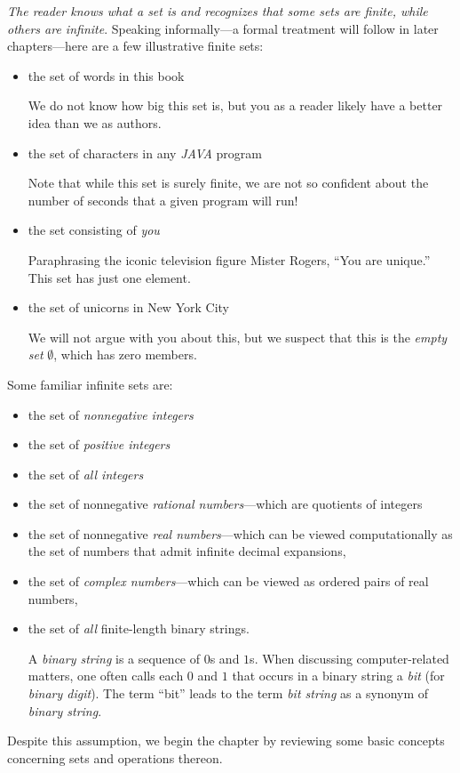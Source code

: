{\em The reader knows what a set is and recognizes that some sets are
  finite, while others are infinite}.  Speaking informally---a formal
treatment will follow in later chapters---here are a few illustrative
finite sets:
\begin{itemize}
\item
the set of words in this book

We do not know how big this set is, but you as a reader likely have a
better idea than we as authors.
\item
the set of characters in any {\it JAVA} program

Note that while this set is surely finite, we are not so confident
about the number of seconds that a given program will run!
\item
the set consisting of {\em you}

Paraphrasing the iconic television figure Mister Rogers, ``You are
unique.''  This set has just one element.

\item
the set of unicorns in New York City

We will not argue with you about this, but we suspect that this is the
{\em empty set} $\emptyset$, which has zero members.
\end{itemize}
Some familiar infinite sets are:
\begin{itemize}
\item
the set of {\em nonnegative integers}
\item
the set of {\em positive integers}
\item
the set of {\em all integers}
\item
the set of nonnegative {\em rational numbers}---which are quotients of
integers
\item
the set of nonnegative {\em real numbers}---which can be viewed
computationally as the set of numbers that admit infinite decimal
expansions,
\item
the set of {\em complex numbers}---which can be viewed as ordered
pairs of real numbers,
\item
the set of {\em all} finite-length binary strings.

A {\it binary string} is a sequence of $0$s and
$1$s.  When discussing computer-related matters, one often calls each
$0$ and $1$ that occurs in a binary string a {\it bit} (for {\it binary digit}).  The term ``bit'' leads to
the term {\it bit string} as a synonym of {\it binary string}.
\end{itemize}
Despite this assumption, we begin the chapter by reviewing some basic
concepts concerning sets and operations thereon.

